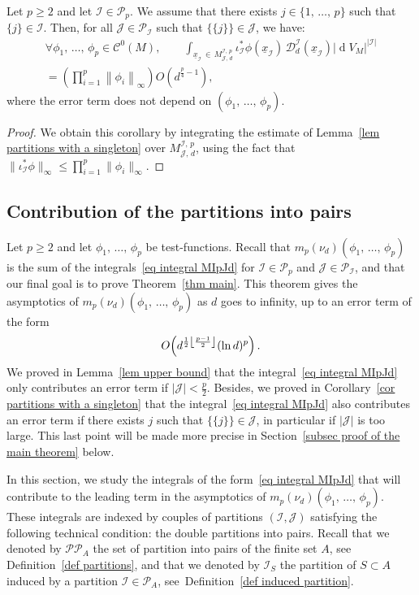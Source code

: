 \documentclass[10pt]{amsart}
\theoremstyle{definition}\newtheorem{defi}[theo]{Definition}\newtheorem{rema}[theo]{Remark}\newtheorem{exam}[theo]{Example}\newtheorem{exem}[theo]{Example}\newtheorem{nota}[theo]{Notation}
\DeclareMathOperator{\dmesure}{d}
\DeclarePairedDelimiter{\floor}{\lfloor}{\rfloor}
\newcommand{\D}{\mathcal{D}}
\newcommand{\I}{\mathcal{I}}
\newcommand{\J}{\mathcal{J}}
\newcommand{\clC}{\mathcal{C}}
\newcommand{\pa}{\mathcal{P}\!}
\newcommand{\pp}{\mathcal{P\!P}\!}
\newcommand{\norm}[1]{\left\lvert #1 \right\rvert}
\newcommand{\Norm}[1]{\left\lVert #1 \right\rVert}
\newcommand{\rmes}[1]{\norm{\dmesure\! V_{#1}}}
\renewcommand{\geq}{\geqslant}
\renewcommand{\leq}{\leqslant}
\let\oldforall\forall
\renewcommand*{\forall}{\mathrel{\oldforall}}
\begin{document}
\begin{coro}\label{cor partitions with a singleton}
Let $p \geq 2$ and let $\I \in \pa_p$. We assume that there exists $j \in \{1,\,\dots,\,p\}$ such that $\{j\} \in \I$. Then, for all $\J \in \pa_\I$ such that $\{\{j\}\} \in \J$, we have:
\begin{multline*}
\forall \phi_1,\,\dots,\,\phi_p \in \clC^0(M), \qquad \int_{\underline{x}_\I\,\in\,M^{\I,\,p}_{\J,\,d}} \iota_\I^*\phi(\underline{x}_\I)\, \D^\I_d(\underline{x}_\I) \rmes{M}^{\norm{\I}}\\
= \left(\prod_{i=1}^p \Norm{\phi_i}_\infty\right) O\left(d^{\frac{p}{4}-1}\right),
\end{multline*}
where the error term does not depend on $(\phi_1,\,\dots,\,\phi_p)$.
\end{coro}

\begin{proof}
We obtain this corollary by integrating the estimate of Lemma~\ref{lem partitions with a singleton} over $M^{\I,\,p}_{\J,\,d}$, using the fact that $\|\iota_\I^* \phi\|_\infty \leq \prod_{i=1}^p \|\phi_i\|_\infty$.
\end{proof}



\subsection{Contribution of the partitions into pairs}\label{subsec contribution of the partitions into pairs}

Let $p \geq 2$ and let $\phi_1,\,\dots,\,\phi_p$ be test-functions. Recall that $m_p(\nu_d)(\phi_1,\,\dots,\,\phi_p)$ is the sum of the integrals~\eqref{eq integral MIpJd} for $\I \in \pa_p$ and $\J \in \pa_\I$, and that our final goal is to prove Theorem~\ref{thm main}. This theorem gives the asymptotics of $m_p(\nu_d)(\phi_1,\,\dots,\,\phi_p)$ as $d$ goes to infinity, up to an error term of the form
\[
O\!\left(d^{\frac{1}{2}\floor*{\frac{p-1}{2}}}(\ln d)^p\right).
\]
We proved in Lemma~\ref{lem upper bound} that the integral~\eqref{eq integral MIpJd} only contributes an error term if $|\J| < \tfrac{p}{2}$. Besides, we proved in Corollary~\ref{cor partitions with a singleton} that the integral~\eqref{eq integral MIpJd} also contributes an error term if there exists $j$ such that $\{\{j\}\} \in \J$, in particular if $|\J|$ is too large. This last point will be made more precise in Section~\ref{subsec proof of the main theorem} below.

In this section, we study the integrals of the form~\eqref{eq integral MIpJd} that will contribute to the leading term in the asymptotics of $m_p(\nu_d)(\phi_1,\,\dots,\,\phi_p)$. These integrals are indexed by couples of partitions $(\I,\J)$ satisfying the following technical condition: the double partitions into pairs. Recall that we denoted by $\pp_A$ the set of partition into pairs of the finite set $A$, see Definition~\ref{def partitions}, and that we denoted by $\I_S$ the partition of $S \subset A$ induced by a partition $\I \in \pa_A$, see~Definition~\ref{def induced partition}.
\end{document}
